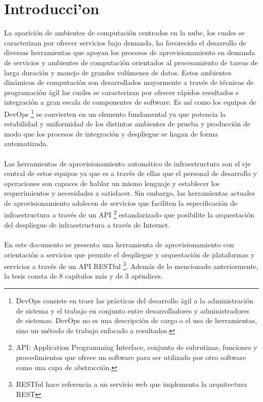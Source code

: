 \chapter{Introducci'on}

La aparición de ambientes de computación centrados en la nube, los cuales se caracterizan por ofrecer servicios bajo demanda, ha favorecido el desarrollo de diversas herramientas que apoyan los procesos de aprovisionamiento en demanda de servicios y ambientes de computación orientados al procesamiento de tareas de larga duración y manejo de grandes volúmenes de datos. Estos ambientes dinámicos de computación son desarrollados mayormente a través de técnicas de programación ágil las cuales se caracterizan por ofrecer rápidos resultados e integración a gran escala de componentes de software. Es así como los equipos de DevOps \footnote{DevOps consiste en traer las prácticas del desarrollo ágil a la administración de sistema y el trabajo en conjunto entre desarrolladores y administradores de sistemas. DevOps no es una descripción de cargo o el uso de herramientas, sino un método de trabajo enfocado a resultados.} se convierten en un elemento fundamental ya que potencia la estabilidad y uniformidad de los distintos ambientes de prueba y producción de modo que los procesos de integración y despliegue se hagan de forma automatizada. \\
\\
Las herramientas de aprovisionamiento automático de infraestructura son el eje central de estos equipos ya que es a través de ellas que el personal de desarrollo y operaciones son capaces de hablar un mismo lenguaje y establecer los requerimientos y necesidades a satisfacer. Sin embargo, las herramientas actuales de aprovisionamiento adolecen de servicios que faciliten la especificación de infraestructura a través de un API \footnote{ API: Application Programming Interface, conjunto de subrutinas, funciones y procedimientos que ofrece un software para ser utilizado por otro software como una capa de abstracción.} estandarizado que posibilite la orquestación del despliegue de infraestructura a través de Internet.\\
\\
En este documento se presenta una herramienta de aprovisionamiento con orientación a servicios que permite el despliegue y orquestación de plataformas y servicios a través de un API RESTful \footnote{RESTful hace referencia a un servicio web que implementa la arquitectura REST}. Además de lo mencionado anteriormente, la tesis consta de 8 capítulos más y de 3 apéndices.\\
